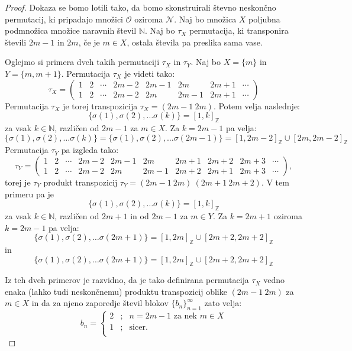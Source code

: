 \documentclass[12pt,a4paper,reqno]{amsart}
\theoremstyle{definition} %
\theoremstyle{plain} %
\newcommand{\N}{\mathbb N}
\newcommand{\Z}{\mathbb Z}
\begin{document}
\begin{proof}
Dokaza se bomo lotili tako, da bomo skonstruirali števno neskončno permutacij, ki pripadajo množici $\mathcal{O}$ oziroma $\mathcal{N}$.
Naj bo množica $X$ poljubna podmnožica množice naravnih števil $\N$. Naj bo $\tau_X$ permutacija, ki transponira števili $2m-1$ in $2m$, če je $m\in X$, ostala števila pa preslika sama vase. %

Oglejmo si  primera dveh takih permutaciji $\tau_X$ in $\tau_Y$. Naj bo $X=\{m\}$ in $Y=\{m,m+1\}$. Permutacija $\tau_X$ je videti tako:
$$\tau_X =
\left(
\begin{array}{cccccccc}
1 & 2 & \cdots & 2m-2 & 2m-1 & 2m & 2m+1 & \cdots \\  
1 & 2 & \cdots & 2m-2 & 2m & 2m-1 & 2m+1 & \cdots
  \end{array}
\right)$$
Permutacija $\tau_X$ je torej transpozicija $\tau_X = (2m-1 \: 2m)$.
Potem velja naslednje:
$$\{ \sigma (1), \sigma (2), \ldots \sigma (k) \} = [1, k]_{\Z}$$
za vsak $k\in \N$, različen od $2m-1$ za $m\in X$. Za $k=2m-1$ pa velja:
$$\{ \sigma (1), \sigma (2), \ldots \sigma (k) \} =\{ \sigma (1), \sigma (2), \ldots \sigma (2m-1) \}= [1, 2m-2]_{\Z} \cup [2m, 2m-2]_{\Z}$$
Permutacija $\tau_Y$ pa izgleda tako:
$$\tau_Y =
\left(
\begin{array}{cccccccccc}
1 & 2 & \cdots & 2m-2 & 2m-1 & 2m & 2m+1 & 2m+2 & 2m+3 & \cdots \\  
1 & 2 & \cdots & 2m-2 & 2m & 2m-1 & 2m+2 & 2m+1 & 2m+3 & \cdots
  \end{array}
\right),$$
torej je $\tau_Y$ produkt transpozicij $\tau_Y=(2m-1 \: 2m)\: (2m+1 \: 2m+2)$.
V tem primeru pa je 
$$\{ \sigma (1), \sigma (2), \ldots \sigma (k) \} = [1, k]_{\Z}$$
za vsak $k\in \N$, različen od $2m+1$ in od $2m-1$ za $m\in Y$. Za $k=2m+1$ oziroma $k=2m-1$ pa velja:
$$\{ \sigma (1), \sigma (2), \ldots \sigma (2m+1) \}= [1, 2m]_{\Z} \cup [2m+2, 2m+2]_{\Z}$$
in 
$$\{ \sigma (1), \sigma (2), \ldots \sigma (2m+1) \}= [1, 2m]_{\Z} \cup [2m+2, 2m+2]_{\Z}$$

Iz teh dveh primerov je razvidno, da je tako definirana permutacija $\tau_X$ vedno enaka (lahko tudi neskončnemu) produktu transpozicij oblike $(2m-1 \: 2m)$ za $m \in X$ in da za njeno zaporedje števil blokov $\{b_n\}_{n=1}^{\infty}$ zato velja:
$$b_n = 
\left\{ 
\begin{array}{ccc}
2&;&n=2m-1\textrm{ za nek }m \in X\\
1&;&\textrm{sicer.}\\
\end{array}
\right. 
$$


\end{proof}
\end{document}
